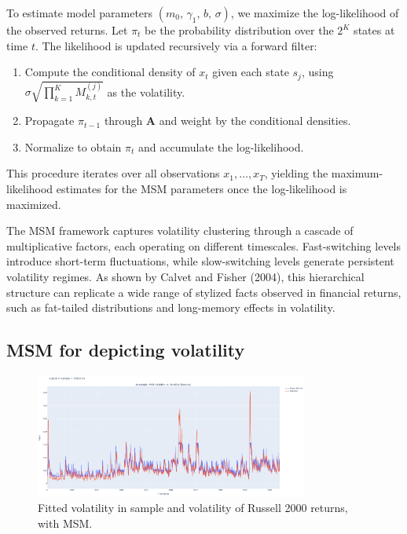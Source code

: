 To estimate model parameters $(m_0,\,\gamma_1,\,b,\,\sigma)$, we maximize the log-likelihood of the observed returns. Let $\pi_t$ be the probability distribution over the $2^K$ states at time $t$. The likelihood is updated recursively via a forward filter:
\begin{enumerate}
    \item Compute the conditional density of $x_t$ given each state $s_j$,
          using $\sigma \sqrt{\prod_{k=1}^K M_{k,t}^{(j)}}$ as the volatility.
    \item Propagate $\pi_{t-1}$ through $\mathbf{A}$ and weight by the conditional densities.
    \item Normalize to obtain $\pi_t$ and accumulate the log-likelihood.
\end{enumerate}
This procedure iterates over all observations $x_1,\ldots,x_T$, yielding the maximum-likelihood estimates for the MSM parameters once the log-likelihood is maximized.

The MSM framework captures volatility clustering through a cascade of multiplicative factors, each operating on different timescales. Fast-switching levels introduce short-term fluctuations, while slow-switching levels generate persistent volatility regimes. As shown by Calvet and Fisher (2004), this hierarchical structure can replicate a wide range of stylized facts observed in financial returns, such as fat-tailed distributions and long-memory effects in volatility.





\subsection{MSM for depicting volatility}

\begin{figure}[!ht]
    \centering
    \includegraphics[width=0.8\textwidth]{img/msm_vol}
    \caption{Fitted volatility in sample and volatility of Russell  2000 returns, with MSM.}
    \label{fig:msm_fitted_vol}
\end{figure}

